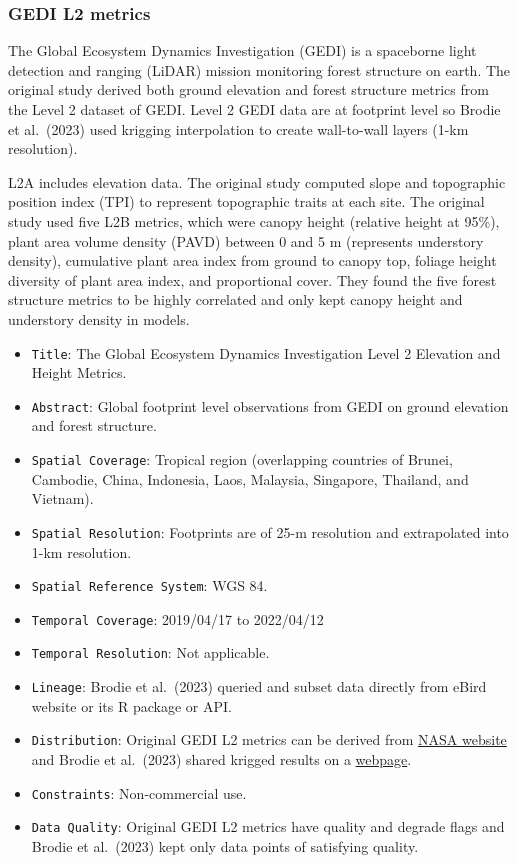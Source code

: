 \documentclass[
]{article}
\providecommand{\tightlist}{%
  \setlength{\itemsep}{0pt}\setlength{\parskip}{0pt}}
\begin{document}
\hypertarget{gedi-l2-metrics}{%
\subsubsection{GEDI L2 metrics}\label{gedi-l2-metrics}}

The Global Ecosystem Dynamics Investigation (GEDI) is a spaceborne light
detection and ranging (LiDAR) mission monitoring forest structure on
earth. The original study derived both ground elevation and forest
structure metrics from the Level 2 dataset of GEDI. Level 2 GEDI data
are at footprint level so Brodie et al.~(2023) used krigging
interpolation to create wall-to-wall layers (1-km resolution).

L2A includes elevation data. The original study computed slope and
topographic position index (TPI) to represent topographic traits at each
site. The original study used five L2B metrics, which were canopy height
(relative height at 95\%), plant area volume density (PAVD) between 0
and 5 m (represents understory density), cumulative plant area index
from ground to canopy top, foliage height diversity of plant area index,
and proportional cover. They found the five forest structure metrics to
be highly correlated and only kept canopy height and understory density
in models.

\begin{itemize}
\tightlist
\item
  \texttt{Title}: The Global Ecosystem Dynamics Investigation Level 2
  Elevation and Height Metrics.
\item
  \texttt{Abstract}: Global footprint level observations from GEDI on
  ground elevation and forest structure.
\item
  \texttt{Spatial\ Coverage}: Tropical region (overlapping countries of
  Brunei, Cambodie, China, Indonesia, Laos, Malaysia, Singapore,
  Thailand, and Vietnam).
\item
  \texttt{Spatial\ Resolution}: Footprints are of 25-m resolution and
  extrapolated into 1-km resolution.
\item
  \texttt{Spatial\ Reference\ System}: WGS 84.
\item
  \texttt{Temporal\ Coverage}: 2019/04/17 to 2022/04/12
\item
  \texttt{Temporal\ Resolution}: Not applicable.
\item
  \texttt{Lineage}: Brodie et al.~(2023) queried and subset data
  directly from eBird website or its R package or API.
\item
  \texttt{Distribution}: Original GEDI L2 metrics can be derived from
  \href{https://cmr.earthdata.nasa.gov/search/concepts/C1908348134-LPDAAC_ECS.html}{NASA
  website} and Brodie et al.~(2023) shared krigged results on a
  \href{https://rcdata.nau.edu/geode_data/SEA_vertebrate_diversity_rasters}{webpage}.
\item
  \texttt{Constraints}: Non-commercial use.
\item
  \texttt{Data\ Quality}: Original GEDI L2 metrics have quality and
  degrade flags and Brodie et al.~(2023) kept only data points of
  satisfying quality.
\end{itemize}
\end{document}
